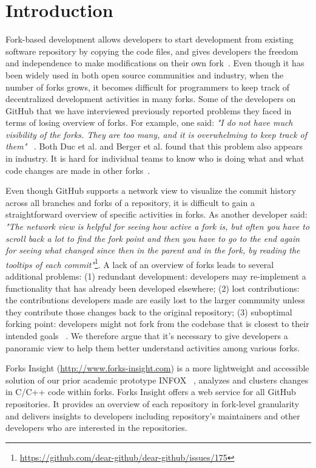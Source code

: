 \section{Introduction}
Fork-based development allows developers to start development from existing software repository by copying the code files, and gives developers the freedom and independence to make modifications on their own fork~\cite{dubinsky2013exploratory, bitzer2006impact, ernst2010code,vetter2007open}. Even though it has been widely used in both open source communities and industry, when the number of forks grows, it becomes difficult for programmers to keep track of decentralized development activities in many forks. Some of the developers on GitHub that we have interviewed previously reported problems they faced in terms of losing overview of forks. For example, one said: \emph{"I do not have much visibility of the forks. They are too many, and it is overwhelming to keep track of them"} ~\cite{ZSLXWK:ICSE18}. Both Duc et al. and Berger et al. found that this problem also appears in industry. It is hard for individual teams to know who is doing what and what code changes are made in other forks~\cite{berger2014three,Duc:2014:FCM:2652524.2652546}.

Even though GitHub supports a network view to visualize the commit history across all branches and forks of a repository, it is difficult to gain a straightforward overview of specific activities in forks. As another developer said: \emph{"The network view is helpful for seeing how active a fork is, but often you have to scroll back a lot to find the fork point and then you have to go to the end again for seeing what changed since then in the parent and in the fork, by reading the tooltips of each commit"}\footnote{\url{https://github.com/dear-github/dear-github/issues/175}}.
 A lack of an overview of forks leads to several additional problems: (1) redundant development: developers may re-implement a functionality that has already been developed elsewhere; (2) lost contributions: the contributions developers made are easily lost to the larger community unless they contribute those changes back to the original repository; (3) suboptimal forking point: developers might not fork from the codebase that is closest to their intended goals ~\cite{ZSLXWK:ICSE18, dubinsky2013exploratory,stanciulescu2015forked}. We therefore argue that it's necessary to give developers a panoramic view to help them better understand activities among various forks.

Forks Insight (\url{http://www.forks-insight.com}) is a more lightweight and accessible solution of our prior academic prototype INFOX ~\cite{ZSLXWK:ICSE18}, analyzes and clusters changes in C/C++ code within forks. Forks Insight offers a web service for all GitHub repositories. It provides an overview of each repository in fork-level granularity and delivers insights to developers including repository's maintainers and other developers who are interested in the repositories.

